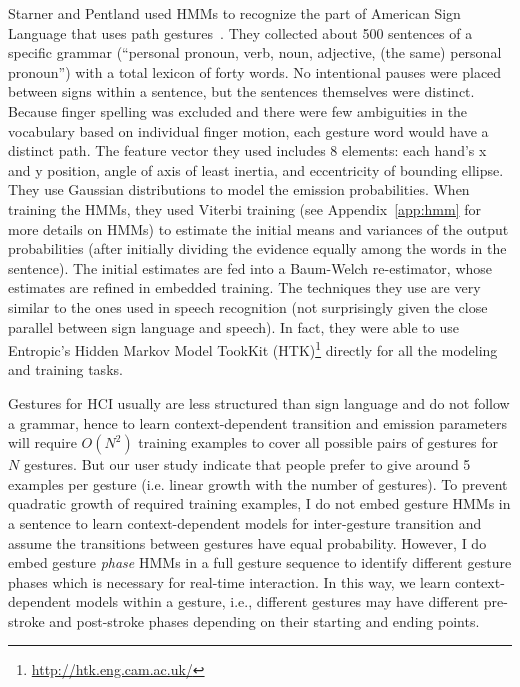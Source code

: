 Starner and Pentland used HMMs to recognize the part of American Sign Language
that uses path gestures~\cite{Starner95}. They collected about 500 sentences of a specific grammar (``personal pronoun, verb, noun, adjective, (the same) personal pronoun'') with a total lexicon of
forty words. No intentional pauses were placed between signs within a
sentence, but the sentences themselves were distinct. Because finger spelling
was excluded and there were few ambiguities in the
vocabulary based on individual finger motion, each gesture word would have a
distinct path.
The feature vector they used includes 8 elements:
each hand's x and y position, angle of axis of least inertia, and eccentricity of bounding ellipse.
They use Gaussian distributions to model the emission probabilities.
When training the HMMs, they used Viterbi training (see Appendix~\ref{app:hmm}
for more details on HMMs) to estimate the initial means and variances of the
output probabilities (after initially dividing the evidence equally among the
words in the sentence).
The initial estimates are fed into a Baum-Welch re-estimator, whose estimates are refined in embedded training.
The techniques they use are very similar to the ones used in speech
recognition (not surprisingly given the close parallel between sign language
and speech).
In fact, they were able to use Entropic's Hidden Markov Model TookKit (HTK)\footnote{\url{http://htk.eng.cam.ac.uk/}} directly for all
the modeling and training tasks. 

Gestures for HCI usually are less structured than sign language and do not
follow a grammar, hence to learn context-dependent transition and emission parameters will require $O(N^2)$
training examples to cover all possible pairs of gestures for
$N$ gestures.
But our user study indicate that people prefer to give around 5 examples per
gesture (i.e. linear growth with the number of gestures). To prevent quadratic
growth of required training examples,  I do not embed gesture HMMs in a
sentence to learn context-dependent models for inter-gesture transition and
assume the transitions between gestures have equal probability. However, I do
embed gesture \textit{phase} HMMs in a full gesture sequence to identify
different gesture phases which is necessary for real-time interaction.
In this way, we learn context-dependent models within a gesture, i.e.,
different gestures may have different pre-stroke and post-stroke phases
depending on their starting and ending points. 

